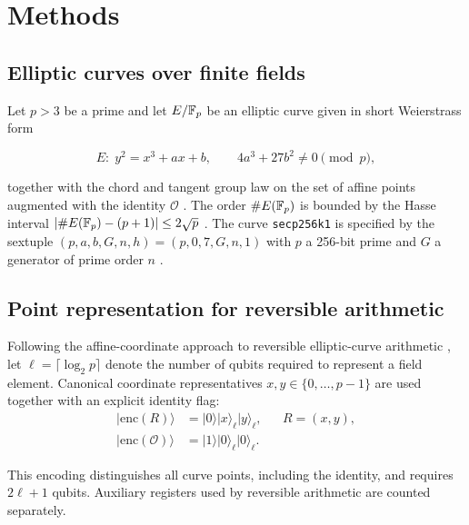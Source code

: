 \section{Methods}
\label{sec:methods} 
\subsection{Elliptic curves over finite fields}
Let $p>3$ be a prime and let $E/\mathbb{F}_p$ be an elliptic curve given in short Weierstrass form \cite{Silverman2009, Washington2008}

\begin{equation}
    E:\; y^{2} = x^{3} + ax + b, \qquad 4a^{3} + 27b^{2} \neq 0 \pmod p,
\end{equation}

together with the chord and tangent group law on the set of affine points augmented with the identity $\mathcal{O}$ \cite{Silverman2009,Washington2008}. The order $\#E(\mathbb{F}_p)$ is bounded by the Hasse interval $|\#E(\mathbb{F}_p) - (p+1)| \leq 2\sqrt{p}$ \cite{Hasse1936}. The curve \texttt{secp256k1} is specified by the sextuple $(p, a, b, G, n, h) = (p, 0, 7, G, n, 1)$ with $p$ a 256-bit prime and $G$ a generator of prime order $n$ \cite{SEC2_2010}.

\begin{revision}

\subsection{Point representation for reversible arithmetic}

Following the affine-coordinate approach to reversible elliptic-curve arithmetic \cite{ProosZalka2003,Roetteler2017}, let $\ell=\lceil\log_2 p\rceil$ denote the number of qubits required to represent a field element. Canonical coordinate representatives $x,y\in\{0,\ldots,p-1\}$ are used together with an explicit identity flag:
\begin{equation}
    \label{eq:point_encoding}
    \begin{aligned}
        \lvert\mathrm{enc}(R)\rangle
          &=\lvert0\rangle\lvert x\rangle_{\ell}
            \lvert y\rangle_{\ell},
            &&R=(x,y),\\
        \lvert\mathrm{enc}(\mathcal{O})\rangle
          &=\lvert1\rangle\lvert0\rangle_{\ell}
            \lvert0\rangle_{\ell}.
    \end{aligned}
\end{equation}

This encoding distinguishes all curve points, including the identity, and requires $2\ell+1$ qubits. Auxiliary registers used by reversible arithmetic are counted separately. 

\end{revision}

